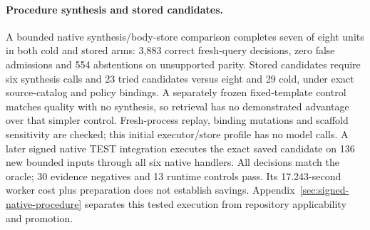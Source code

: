 \paragraph{Procedure synthesis and stored candidates.}
A bounded native synthesis/body-store comparison completes seven of eight units
in both cold and stored arms: 3,883 correct fresh-query decisions, zero false
admissions and 554 abstentions on unsupported parity. Stored candidates require
six synthesis calls and 23 tried candidates versus eight and 29 cold, under exact
source-catalog and policy bindings. A separately frozen fixed-template control
matches quality with no synthesis, so retrieval has no demonstrated advantage
over that simpler control. Fresh-process replay, binding mutations and scaffold
sensitivity are checked; this initial executor/store profile has no model calls.
A later signed native TEST integration executes the exact saved candidate on
136 new bounded inputs through all six native handlers. All decisions match
the oracle; 30 evidence negatives and 13 runtime controls pass. Its 17.243-second
worker cost plus preparation does not establish savings. Appendix~\ref{sec:signed-native-procedure}
separates this tested execution from repository applicability and promotion.


